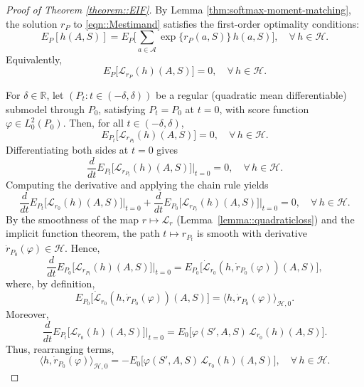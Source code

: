 \documentclass[11pt]{article}
\theoremstyle{plain}
\begin{document}
 \begin{proof}[Proof of Theorem \ref{theorem::EIF}]

By Lemma \ref{thm:softmax-moment-matching}, the solution $r_P$ to
\eqref{eqn::Mestimand} satisfies the first-order optimality conditions:
\[
E_P[h(A,S)]
= E_{P}\!\Big[\sum_{a\in\mathcal A} \exp\{ r_P(a,S) \}\,h(a,S)\Big],
\quad \forall\,  h \in \mathcal{H}.
\]
Equivalently,
\[
E_P\!\Big[\mathcal{L}_{r_P}(h)(A,S)\Big] = 0,
\quad \forall\, h\in\mathcal H.
\]

For $\delta \in \mathbb{R}$, let $(P_t : t \in (-\delta, \delta))$ be a regular (quadratic mean differentiable) submodel through $P_0$, satisfying $P_t = P_0$ at $t=0$, with score function $\varphi \in L^2_0(P_0)$. Then, for all $t \in (-\delta, \delta)$,
\[
E_{P_t}\!\big[\mathcal{L}_{r_{P_t}}(h)(A,S)\big] = 0,
\quad \forall\, h \in \mathcal{H}.
\]
Differentiating both sides at $t=0$ gives
\[
\frac{d}{dt} E_{P_t}\!\big[\mathcal{L}_{r_{P_t}}(h)(A,S)\big]\Big|_{t=0} = 0,
\quad \forall\, h \in \mathcal{H}.
\]
Computing the derivative and applying the chain rule yields
\begin{equation}
\label{eqn::eifproof_chainrule}
\frac{d}{dt} E_{P_t}\!\big[\mathcal{L}_{r_0}(h)(A,S)\big]\Big|_{t=0}
+ \frac{d}{dt} E_{P_0}\!\big[\mathcal{L}_{r_{P_t}}(h)(A,S)\big]\Big|_{t=0}
= 0,
\quad \forall\, h \in \mathcal{H}.
\end{equation}
By the smoothness of the map $r \mapsto \mathcal{L}_r$
(Lemma~\ref{lemma::quadraticloss}) and the implicit function theorem, the path
$t \mapsto r_{P_t}$ is smooth with derivative $\dot{r}_{P_0}(\varphi) \in
\mathcal{H}$. Hence,
\[
\frac{d}{dt} E_{P_0}\!\big[\mathcal{L}_{r_{P_t}}(h)(A,S)\big]\Big|_{t=0}
= E_{P_0}\!\big[\dot{\mathcal{L}}_{r_0}(h, \dot{r}_{P_0}(\varphi))(A,S)\big],
\]
where, by definition, 
\[
E_{P_0}\!\big[\dot{\mathcal{L}}_{r_0}(h, \dot{r}_{P_0}(\varphi))(A,S)\big]
= \langle h, \dot{r}_{P_0}(\varphi) \rangle_{\mathcal{H}, 0}.
\]
Moreover,
\[
\frac{d}{dt} E_{P_t}\!\big[\mathcal{L}_{r_0}(h)(A,S)\big]\Big|_{t=0}
= E_{0}\!\big[\varphi(S',A,S)\,\mathcal{L}_{r_0}(h)(A,S)\big].
\]
Thus, rearranging terms,
\begin{equation}
    \langle h, \dot{r}_{P_0}(\varphi) \rangle_{\mathcal{H}, 0}
= - E_{0}\!\big[\varphi(S',A,S)\,\mathcal{L}_{r_0}(h)(A,S)\big],
\quad \forall\, h \in \mathcal{H}. \label{eqn::hessaninner}
\end{equation}
 
 




\end{proof}
\end{document}
